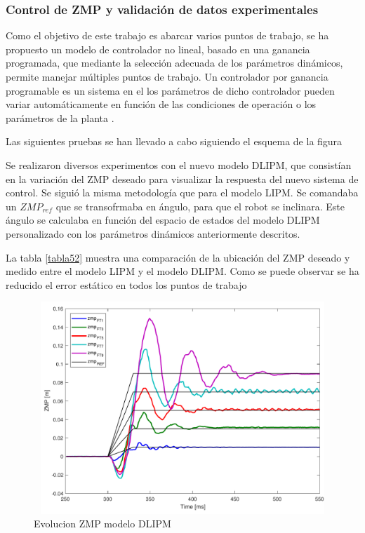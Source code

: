 \subsubsection{Control de ZMP y validación de datos experimentales}

Como el objetivo de este trabajo es abarcar varios puntos de trabajo, se ha propuesto un modelo de controlador no lineal, basado en una ganancia programada, que mediante la selección adecuada de los parámetros dinámicos, permite manejar múltiples puntos de trabajo. Un controlador por ganancia programable es un sistema en el los parámetros de dicho controlador pueden variar automáticamente en función de las condiciones de operación o los parámetros de la planta \cite{ref22}. 

Las siguientes pruebas se han llevado a cabo siguiendo el esquema de la figura %


Se realizaron diversos experimentos con el nuevo modelo DLIPM, que consistían en la variación del ZMP deseado para visualizar la respuesta del nuevo sistema de control. Se siguió la misma metodología que para el modelo LIPM. Se comandaba un $ZMP_{ref}$ que se transofrmaba en ángulo, para que el robot se inclinara. Este ángulo se calculaba en función del espacio de estados del modelo DLIPM personalizado con los parámetros dinámicos anteriormente descritos.

La tabla \ref{tabla52} muestra una comparación de la ubicación del ZMP deseado y medido entre el modelo LIPM y el modelo DLIPM. Como se puede observar se ha reducido el error estático en todos los puntos de trabajo



\begin{figure}[H]
\centering
\includegraphics[width=13cm, height=8cm]{imagenes/apartado_5/figura4.pdf}
\caption{Evolucion ZMP modelo DLIPM}
\label{figura55}
\end{figure}

